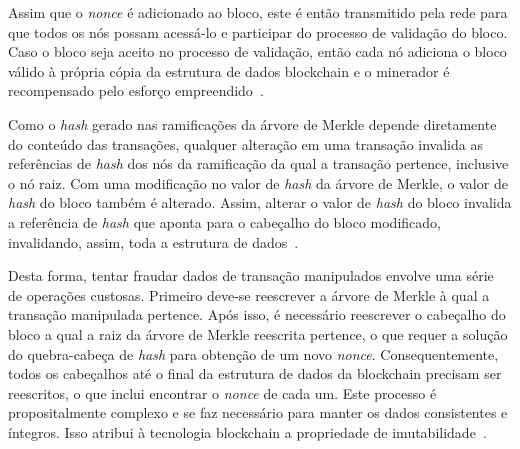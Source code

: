 
Assim que o \textit{nonce} é adicionado ao bloco, este é então transmitido pela rede para que todos os nós possam acessá-lo e participar do processo de validação do bloco. Caso o bloco seja aceito no processo de validação, então cada nó adiciona o bloco válido à própria cópia da estrutura de dados blockchain e o minerador é recompensado pelo esforço empreendido~\cite{overview-bitcoin2008nakamoto}.


Como o \textit{hash} gerado nas ramificações da árvore de Merkle depende diretamente do conteúdo das transações, qualquer alteração em uma transação invalida as referências de \textit{hash} dos nós da ramificação da qual a transação pertence, inclusive o nó raiz. Com uma modificação no valor de \textit{hash} da árvore de Merkle, o valor de \textit{hash} do bloco também é alterado. Assim, alterar o valor de \textit{hash} do bloco invalida a referência de \textit{hash} que aponta para o cabeçalho do bloco modificado, invalidando, assim, toda a estrutura de dados~\cite{antonopoulos2014mastering}.

Desta forma, tentar fraudar dados de transação manipulados envolve uma série de operações custosas. Primeiro deve-se reescrever a árvore de Merkle à qual a transação manipulada pertence. Após isso, é necessário reescrever o cabeçalho do bloco a qual a raiz da árvore de Merkle reescrita pertence, o que requer a solução do quebra-cabeça de \textit{hash} para obtenção de um novo \textit{nonce}. Consequentemente, todos os cabeçalhos até o final da estrutura de dados da blockchain precisam ser reescritos, o que inclui encontrar o \textit{nonce} de cada um. Este processo é propositalmente complexo e se faz necessário para manter os dados consistentes e íntegros. Isso atribui à tecnologia blockchain a propriedade de imutabilidade~\cite{antonopoulos2014mastering, overview-blockchainbasic2018drescher}.


